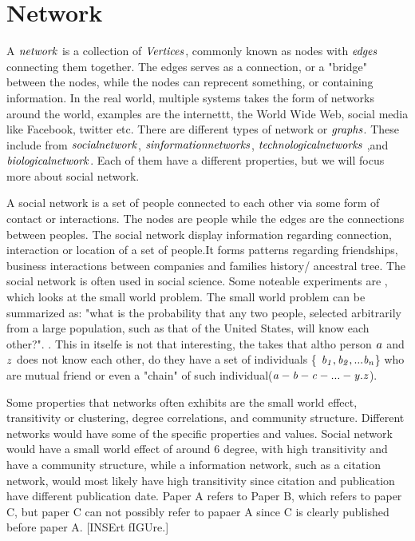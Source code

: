 \section{Network}
A $\it{network}$ is a collection of $\it{Vertices}$, commonly known as nodes with $\it{edges}$ connecting them together\cite{ComplexNetwork2003}. The edges serves as a connection, or a "bridge" between the nodes, while the nodes can reprecent something, or containing information. In the real world, multiple systems takes the form of networks around the world, examples are the internettt, the World Wide Web, social media like Facebook, twitter etc.  There are different types of network or $\it{graphs}$. These include from $\it{social network}$, $\it {sinformation networks}$, $\it{technological networks}$ ,and $\it{biological network}$.  Each of them have a different properties, but we will focus more about social network.

A social network is a set of people connected to each other via some form of contact or interactions\cite{ComplexNetwork2003}. The nodes are people while the edges are the connections between peoples. The social network display information regarding connection, interaction or location of a set of people.It forms patterns regarding friendships, business interactions between companies and families history/ ancestral tree. The social network is often used in social science\cite{ComplexNetwork2003}. Some noteable experiments are \cite{smallWorldExperiment}, which looks at the small world problem. The small world problem can be summarized as: "what is the probability that any two people, selected arbitrarily from a large population, such as that of the United States, will know each other?". \cite{smallworldExperiment1969}. This in itselfe is not that interesting, the \cite{SmallworldExperiment1969} takes that altho person $\it{a}$ and $\it{z}$ does not know each other, do they have a set of individuals \{ $\it {b_1, b_2, ... b_n} $\} who are mutual friend or even a "chain" of such individual($\it {a-b-c-...-y.z}$).

Some properties that networks often exhibits are the small world effect, transitivity or clustering, degree correlations, and community structure\cite{ComplexNetwork2003}. Different networks would have some of the specific properties and values. Social network would have a small world effect of around 6 degree, with high transitivity and have a community structure, while a information network, such as a citation network, would most likely have high transitivity since citation and publication have different publication date. Paper A refers to Paper B, which refers to paper C, but paper C can not possibly refer to papaer A since C is clearly published before paper A. [INSErt fIGUre.]

